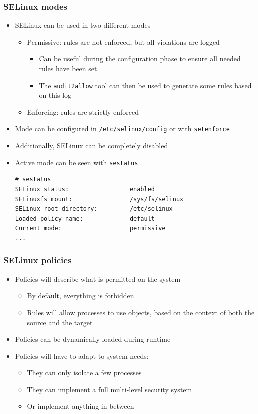 \begin{frame}[fragile]
	\frametitle{SELinux modes}
	\begin{itemize}
		\item SELinux can be used in two different modes
			\begin{itemize}
				\item Permissive: rules are not enforced, but all violations are logged
					\begin{itemize}
						\item Can be useful during the configuration phase to ensure
							all needed rules have been set.
						\item The \texttt{audit2allow} tool can then be used to generate
							some rules based on this log
					\end{itemize}
				\item Enforcing: rules are strictly enforced
			\end{itemize}
		\item Mode can be configured in \texttt{/etc/selinux/config} or with
			\texttt{setenforce}
		\item Additionally, SELinux can be completely disabled
		\item Active mode can be seen with \texttt{sestatus}
			\begin{block}{}
				{\tiny
				\begin{verbatim}
# sestatus
SELinux status:                 enabled
SELinuxfs mount:                /sys/fs/selinux
SELinux root directory:         /etc/selinux
Loaded policy name:             default
Current mode:                   permissive
...
\end{verbatim}
}
			\end{block}
	\end{itemize}
\end{frame}

\begin{frame}[fragile]
	\frametitle{SELinux policies}
	\begin{itemize}
		\item Policies will describe what is permitted on the system
			\begin{itemize}
				\item By default, everything is forbidden
				\item Rules will allow processes to use objects, based on the context of
					both the source and the target
			\end{itemize}
		\item Policies can be dynamically loaded during runtime
		\item Policies will have to adapt to system needs:
			\begin{itemize}
				\item They can only isolate a few processes
				\item They can implement a full multi-level security system
				\item Or implement anything in-between
			\end{itemize}
	\end{itemize}
\end{frame}

